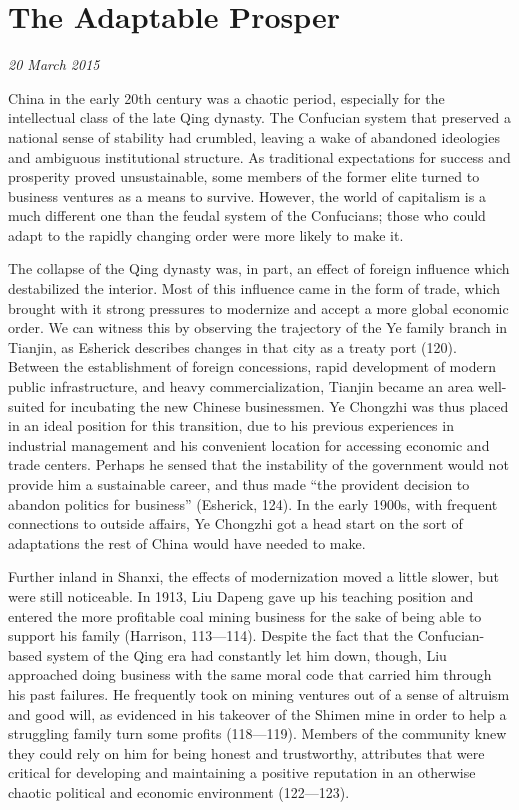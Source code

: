 \section{The Adaptable Prosper}

\textit{20 March 2015}

China in the early 20th century was a chaotic period, especially for the
intellectual class of the late Qing dynasty.  The Confucian system that
preserved a national sense of stability had crumbled, leaving a wake of
abandoned ideologies and ambiguous institutional structure. As traditional
expectations for success and prosperity proved unsustainable, some members of
the former elite turned to business ventures as a means to survive.  However,
the world of capitalism is a much different one than the feudal system of the
Confucians; those who could adapt to the rapidly changing order were more likely
to make it.

The collapse of the Qing dynasty was, in part, an effect of foreign influence
which destabilized the interior. Most of this influence came in the form of
trade, which brought with it strong pressures to modernize and accept a more
global economic order. We can witness this by observing the trajectory of the Ye
family branch in Tianjin, as Esherick describes changes in that city as a treaty
port (120).  Between the establishment of foreign concessions, rapid development
of modern public infrastructure, and heavy commercialization, Tianjin became an
area well-suited for incubating the new Chinese businessmen. Ye Chongzhi was
thus placed in an ideal position for this transition, due to his previous
experiences in industrial management and his convenient location for accessing
economic and trade centers. Perhaps he sensed that the instability of the
government would not provide him a sustainable career, and thus made ``the
provident decision to abandon politics for business'' (Esherick, 124). In the
early 1900s, with frequent connections to outside affairs, Ye Chongzhi got a
head start on the sort of adaptations the rest of China would have needed to
make.

Further inland in Shanxi, the effects of modernization moved a little slower,
but were still noticeable. In 1913, Liu Dapeng gave up his teaching position and
entered the more profitable coal mining business for the sake of being able to
support his family (Harrison, 113—114). Despite the fact that the
Confucian-based system of the Qing era had constantly let him down, though, Liu
approached doing business with the same moral code that carried him through his
past failures. He frequently took on mining ventures out of a sense of altruism
and good will, as evidenced in his takeover of the Shimen mine in order to help
a struggling family turn some profits (118—119). Members of the community knew
they could rely on him for being honest and trustworthy, attributes that were
critical for developing and maintaining a positive reputation in an otherwise
chaotic political and economic environment (122—123).

